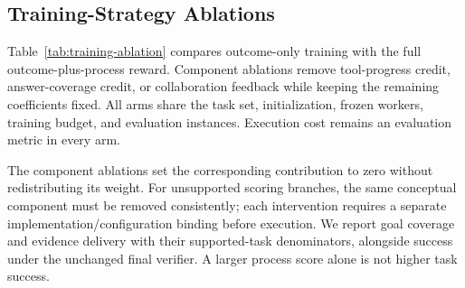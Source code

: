 \subsection{Training-Strategy Ablations}

Table~\ref{tab:training-ablation} compares outcome-only training with the full outcome-plus-process reward. Component ablations remove tool-progress credit, answer-coverage credit, or collaboration feedback while keeping the remaining coefficients fixed. All arms share the task set, initialization, frozen workers, training budget, and evaluation instances. Execution cost remains an evaluation metric in every arm.



The component ablations set the corresponding contribution to zero without redistributing its weight. For unsupported scoring branches, the same conceptual component must be removed consistently; each intervention requires a separate implementation/configuration binding before execution. We report goal coverage and evidence delivery with their supported-task denominators, alongside success under the unchanged final verifier. A larger process score alone is not higher task success. 
